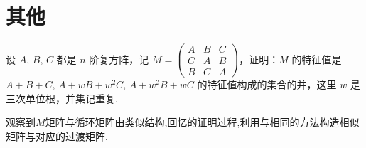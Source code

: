 \documentclass[../../main.tex]{subfiles}
\begin{document}
\section{其他}

\begin{example}
设 $A$, $B$, $C$ 都是 $n$ 阶复方阵，记 $M = \begin{pmatrix}
A & B & C \\
C & A & B \\
B & C & A
\end{pmatrix}$，证明：$M$ 的特征值是 $A + B + C$, $A + wB + w^{2}C$, $A + w^{2}B + wC$ 的特征值构成的集合的并，这里 $w$ 是三次单位根，并集记重复. 
\end{example}
\begin{note}
观察到$M$矩阵与循环矩阵由类似结构,回忆的证明过程,利用与相同的方法构造相似矩阵与对应的过渡矩阵.
\end{note}
\end{document}
